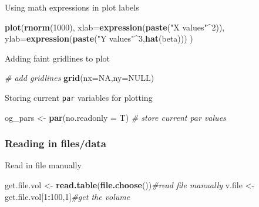 \documentclass[10,portrait]{article}
\newenvironment{Shaded}{\begin{snugshade}}{\end{snugshade}}
\newcommand{\KeywordTok}[1]{\textcolor[rgb]{0.13,0.29,0.53}{\textbf{#1}}}
\newcommand{\DataTypeTok}[1]{\textcolor[rgb]{0.13,0.29,0.53}{#1}}
\newcommand{\DecValTok}[1]{\textcolor[rgb]{0.00,0.00,0.81}{#1}}
\newcommand{\StringTok}[1]{\textcolor[rgb]{0.31,0.60,0.02}{#1}}
\newcommand{\CommentTok}[1]{\textcolor[rgb]{0.56,0.35,0.01}{\textit{#1}}}
\newcommand{\OtherTok}[1]{\textcolor[rgb]{0.56,0.35,0.01}{#1}}
\newcommand{\OperatorTok}[1]{\textcolor[rgb]{0.81,0.36,0.00}{\textbf{#1}}}
\newcommand{\NormalTok}[1]{#1}
\begin{document}
Using math expressions in plot labels

\begin{Shaded}
\begin{Highlighting}[]
\KeywordTok{plot}\NormalTok{(}\KeywordTok{rnorm}\NormalTok{(}\DecValTok{1000}\NormalTok{),}
     \DataTypeTok{xlab=}\KeywordTok{expression}\NormalTok{(}\KeywordTok{paste}\NormalTok{(}\StringTok{"X values"}\OperatorTok{^}\DecValTok{2}\NormalTok{)),}
     \DataTypeTok{ylab=}\KeywordTok{expression}\NormalTok{(}\KeywordTok{paste}\NormalTok{(}\StringTok{"Y values"}\OperatorTok{^}\DecValTok{3}\NormalTok{,}\KeywordTok{hat}\NormalTok{(beta)))}
\NormalTok{)}
\end{Highlighting}
\end{Shaded}

Adding faint gridlines to plot

\begin{Shaded}
\begin{Highlighting}[]
\CommentTok{# add gridlines}
\KeywordTok{grid}\NormalTok{(}\DataTypeTok{nx=}\OtherTok{NA}\NormalTok{,}\DataTypeTok{ny=}\OtherTok{NULL}\NormalTok{)}
\end{Highlighting}
\end{Shaded}

Storing current \texttt{par} variables for plotting

\begin{Shaded}
\begin{Highlighting}[]
\NormalTok{og_pars <-}\StringTok{ }\KeywordTok{par}\NormalTok{(}\DataTypeTok{no.readonly =}\NormalTok{ T) }\CommentTok{# store current par values}
\end{Highlighting}
\end{Shaded}

\subsubsection{Reading in files/data}\label{reading-in-filesdata}

Read in file manually

\begin{Shaded}
\begin{Highlighting}[]
\NormalTok{get.file.vol <-}\StringTok{ }\KeywordTok{read.table}\NormalTok{(}\KeywordTok{file.choose}\NormalTok{())}\CommentTok{#read file manually}
\NormalTok{v.file <-}\StringTok{ }\NormalTok{get.file.vol[}\DecValTok{1}\OperatorTok{:}\DecValTok{100}\NormalTok{,}\DecValTok{1}\NormalTok{]}\CommentTok{#get the volume}
\end{Highlighting}
\end{Shaded}
\end{document}
